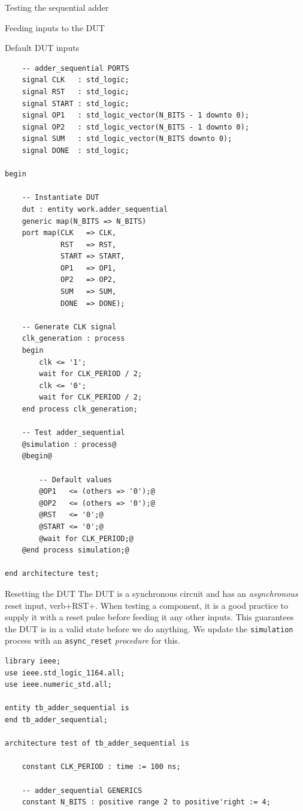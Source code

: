 \documentclass[lab]{course}
\begin{document}
\begin{section}{Testing the sequential adder}
\begin{subsection}{Feeding inputs to the DUT}
\begin{subsubsection}{Default DUT inputs}
\begin{lstlisting}
    -- adder_sequential PORTS
    signal CLK   : std_logic;
    signal RST   : std_logic;
    signal START : std_logic;
    signal OP1   : std_logic_vector(N_BITS - 1 downto 0);
    signal OP2   : std_logic_vector(N_BITS - 1 downto 0);
    signal SUM   : std_logic_vector(N_BITS downto 0);
    signal DONE  : std_logic;

begin

    -- Instantiate DUT
    dut : entity work.adder_sequential
    generic map(N_BITS => N_BITS)
    port map(CLK   => CLK,
             RST   => RST,
             START => START,
             OP1   => OP1,
             OP2   => OP2,
             SUM   => SUM,
             DONE  => DONE);

    -- Generate CLK signal
    clk_generation : process
    begin
        clk <= '1';
        wait for CLK_PERIOD / 2;
        clk <= '0';
        wait for CLK_PERIOD / 2;
    end process clk_generation;

    -- Test adder_sequential
    @simulation : process@
    @begin@

        -- Default values
        @OP1   <= (others => '0');@
        @OP2   <= (others => '0');@
        @RST   <= '0';@
        @START <= '0';@
        @wait for CLK_PERIOD;@
    @end process simulation;@

end architecture test;
            \end{lstlisting}
        \end{subsubsection}

        \begin{subsubsection}{Resetting the DUT}
            The DUT is a synchronous circuit and has an \emph{asynchronous} reset input, verb+RST+. When testing a component, it is a good practice to supply it with a reset pulse before feeding it any other inputs. This guarantees the DUT is in a valid state before we do anything. We update the \verb+simulation+ process with an \verb+async_reset+ \emph{procedure} for this.

            \begin{lstlisting}[caption={Add \emph{asynchronous} reset}, label={lst:sequential_process_simulation_async_reset}]
library ieee;
use ieee.std_logic_1164.all;
use ieee.numeric_std.all;

entity tb_adder_sequential is
end tb_adder_sequential;

architecture test of tb_adder_sequential is

    constant CLK_PERIOD : time := 100 ns;

    -- adder_sequential GENERICS
    constant N_BITS : positive range 2 to positive'right := 4;


\end{lstlisting}
\end{subsubsection}
\end{subsection}
\end{section}
\end{document}
